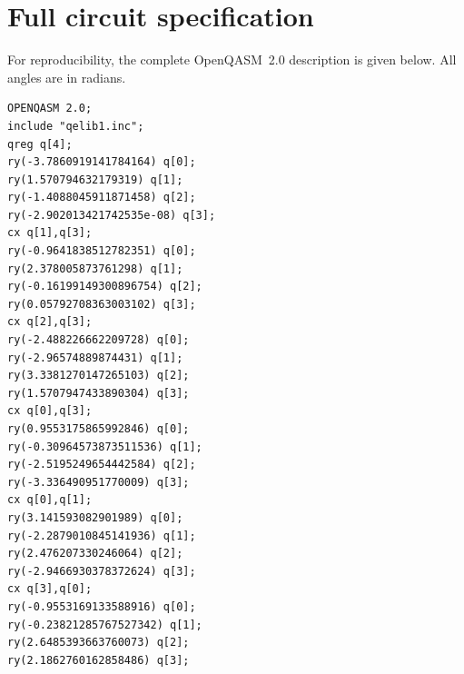 \documentclass[twocolumn,10pt]{article}
\begin{document}
\appendix
\section{Full circuit specification}
\label{app:qasm}

For reproducibility, the complete OpenQASM~2.0 description is given below.
All angles are in radians.

\begin{verbatim}
OPENQASM 2.0;
include "qelib1.inc";
qreg q[4];
ry(-3.7860919141784164) q[0];
ry(1.570794632179319) q[1];
ry(-1.4088045911871458) q[2];
ry(-2.902013421742535e-08) q[3];
cx q[1],q[3];
ry(-0.9641838512782351) q[0];
ry(2.378005873761298) q[1];
ry(-0.16199149300896754) q[2];
ry(0.05792708363003102) q[3];
cx q[2],q[3];
ry(-2.488226662209728) q[0];
ry(-2.96574889874431) q[1];
ry(3.3381270147265103) q[2];
ry(1.5707947433890304) q[3];
cx q[0],q[3];
ry(0.9553175865992846) q[0];
ry(-0.30964573873511536) q[1];
ry(-2.5195249654442584) q[2];
ry(-3.336490951770009) q[3];
cx q[0],q[1];
ry(3.141593082901989) q[0];
ry(-2.2879010845141936) q[1];
ry(2.476207330246064) q[2];
ry(-2.9466930378372624) q[3];
cx q[3],q[0];
ry(-0.9553169133588916) q[0];
ry(-0.23821285767527342) q[1];
ry(2.6485393663760073) q[2];
ry(2.1862760162858486) q[3];
\end{verbatim}
\end{document}
